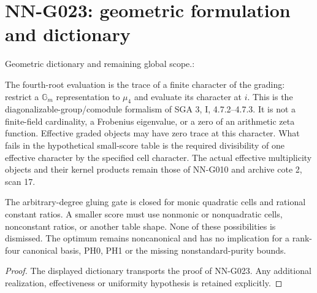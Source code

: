 \section{NN-G023: geometric formulation and dictionary}
\begin{geometricstatement}[NN-G023]
Geometric dictionary and remaining global scope.:

The fourth-root evaluation is the trace of a finite
character of the grading: restrict a $\mathbb G_m$
representation to $\mu_4$ and evaluate its character at
$i$. This is the diagonalizable-group/comodule formalism
of SGA 3, I, 4.7.2--4.7.3. It is not a finite-field
cardinality, a Frobenius eigenvalue, or a zero of an
arithmetic zeta function. Effective graded objects may
have zero trace at this character. What fails in the
hypothetical small-score table is the required divisibility
of one effective character by the specified cell character.
The actual effective multiplicity objects and their
kernel products remain those of NN-G010 and archive
cote 2, scan 17.

The arbitrary-degree gluing gate is closed for monic
quadratic cells and rational constant ratios. A smaller
score must use nonmonic or nonquadratic cells, nonconstant
ratios, or another
table shape. None of these possibilities is dismissed.
The optimum remains noncanonical and has no implication
for a rank-four canonical basis, PH0, PH1 or the missing
nonstandard-purity bounds.


\end{geometricstatement}
\begin{proof} The displayed dictionary transports the proof of NN-G023. Any additional realization, effectiveness or uniformity hypothesis is retained explicitly.\end{proof}


